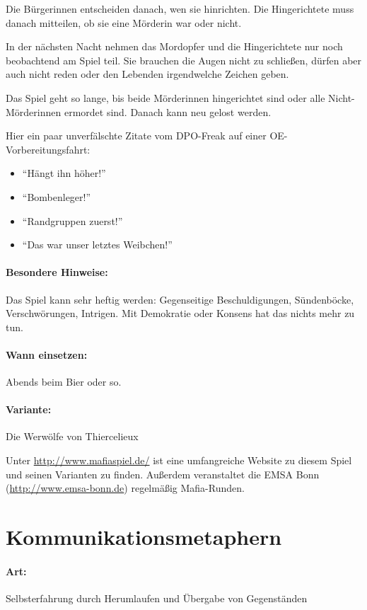 Die Bürgerinnen entscheiden danach, wen sie hinrichten. Die Hingerichtete muss danach mitteilen, ob sie eine Mörderin war oder nicht.

In der nächsten Nacht nehmen das Mordopfer und die Hingerichtete nur noch beobachtend am Spiel teil. Sie brauchen die Augen nicht zu schließen, dürfen aber auch nicht reden oder den Lebenden irgendwelche Zeichen geben.

Das Spiel geht so lange, bis beide Mörderinnen hingerichtet sind oder alle Nicht-Mörderinnen ermordet sind. Danach kann neu gelost werden.

Hier ein paar unverfälschte Zitate vom DPO-Freak auf einer OE-Vorbereitungsfahrt:
\begin{itemize}
  \item "`Hängt ihn höher!"'
  \item "`Bombenleger!"'
  \item "`Randgruppen zuerst!"'
  \item "`Das war unser letztes Weibchen!"'
\end{itemize} 

\paragraph{Besondere Hinweise:} Das Spiel kann sehr heftig werden: Gegenseitige Beschuldigungen, Sündenböcke, Verschwörungen, Intrigen. Mit Demokratie oder Konsens hat das nichts mehr zu tun.
\paragraph{Wann einsetzen:} Abends beim Bier oder so.
\paragraph{Variante:} Die Werwölfe von Thiercelieux

Unter \url{http://www.mafiaspiel.de/} ist eine umfangreiche Website zu diesem Spiel und seinen Varianten zu finden. Außerdem veranstaltet die EMSA Bonn (\url{http://www.emsa-bonn.de}) regelmäßig Mafia-Runden.

\section{Kommunikationsmetaphern}
\paragraph{Art:} Selbsterfahrung durch Herumlaufen und Übergabe von Gegenständen
